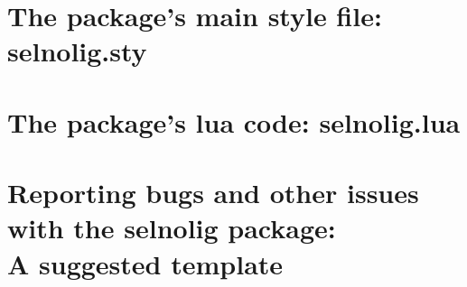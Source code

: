 \documentclass[11pt]{article}
\newcommand{\pkg}[1]{\textsf{#1}}
\begin{document}
\clearpage
\section[The package's main style file: selnolig.sty]
{The package's main style file: \pkg{selnolig.sty}}


\clearpage
\section[The package's lua code: selnolig.lua]{The package's lua code: \pkg{selnolig.lua}}
\label{sec:luacode}



\clearpage
\section[Reporting bugs and other issues with the selnolig package: A suggested template]{Reporting bugs and other issues with the \pkg{selnolig} package:\\A suggested template} \label{sec:template}

\end{document}
